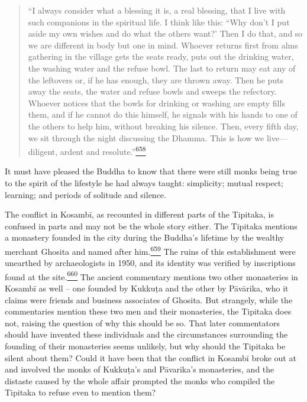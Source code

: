 \begin{quote}
``I always consider what a blessing it is, a real blessing, that I live
with such companions in the spiritual life. I think like this: ``Why
don't I put aside my own wishes and do what the others want?' Then I do
that, and so we are different in body but one in mind. Whoever returns
first from alms gathering in the village gets the seats ready, puts out
the drinking water, the washing water and the refuse bowl. The last to
return may eat any of the leftovers or, if he has enough, they are
thrown away. Then he puts away the seats, the water and refuse bowls and
sweeps the refectory. Whoever notices that the bowls for drinking or
washing are empty fills them, and if he cannot do this himself, he
signals with his hands to one of the others to help him, without
breaking his silence. Then, every fifth day, we sit through the night
discussing the Dhamma. This is how we live---diligent, ardent and
resolute.''\label{footprints_split_016.html_fnref658}\hyperref[footprints_split_025.htmlux5cux23fn658]{\textsuperscript{658}}
\end{quote}

It must have pleased the Buddha to know that there were still monks
being true to the spirit of the lifestyle he had always taught:
simplicity; mutual respect; learning; and periods of solitude and
silence.

The conflict in Kosambī, as recounted in different parts of the
Tipitaka, is confused in parts and may not be the whole story either.
The Tipitaka mentions a monastery founded in the city during the
Buddha's lifetime by the wealthy merchant Ghosita and named after
him.\label{footprints_split_016.html_fnref659}\hyperref[footprints_split_025.htmlux5cux23fn659]{\textsuperscript{659}}
The ruins of this establishment were unearthed by archaeologists in
1950, and its identity was verified by inscriptions found at the
site.\label{footprints_split_016.html_fnref660}\hyperref[footprints_split_025.htmlux5cux23fn660]{\textsuperscript{660}}
The ancient commentary mentions two other monasteries in Kosambī as well
-- one founded by Kukkuṭa and the other by Pāvārika, who it claims were
friends and business associates of Ghosita. But strangely, while the
commentaries mention these two men and their monasteries, the Tipitaka
does not, raising the question of why this should be so. That later
commentators should have invented these individuals and the
circumstances surrounding the founding of their monasteries seems
unlikely, but why should the Tipitaka be silent about them? Could it
have been that the conflict in Kosambī broke out at and involved the
monks of Kukkuṭa's and Pāvarika's monasteries, and the distaste caused
by the whole affair prompted the monks who compiled the Tipitaka to
refuse even to mention them?


